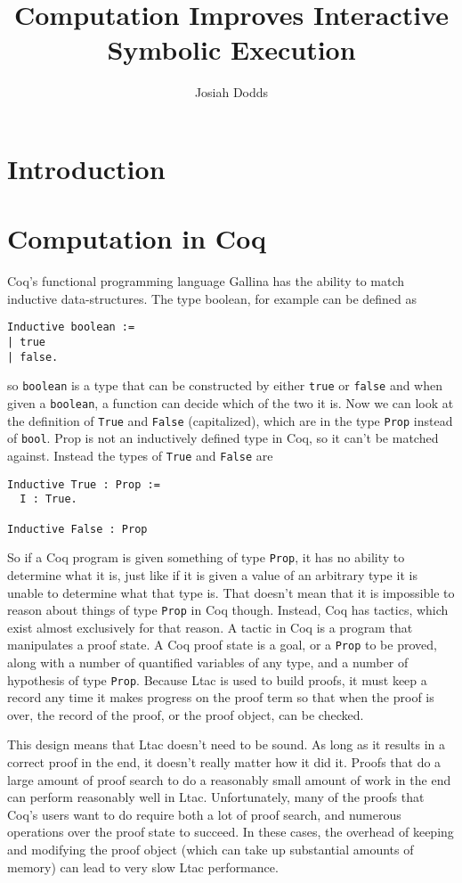 \documentclass{puthesis}
\author{Josiah Dodds}
\title{Computation Improves Interactive Symbolic Execution}
\begin{document}
\chapter{Introduction}

\chapter{Computation in Coq}

Coq's functional programming language Gallina has the ability to match inductive
data-structures. The type boolean, for example can be defined as

\begin{lstlisting}
Inductive boolean :=
| true
| false.
\end{lstlisting}

so \lstinline|boolean| is a type that can be constructed by either \lstinline|true| or \lstinline|false|
and when given a \lstinline|boolean|, a function can decide which of the two it is. Now we can look 
at the definition of \lstinline|True| and \lstinline|False| (capitalized), which are in the type 
\lstinline|Prop| instead of \lstinline|bool|. Prop is not an
inductively defined type in Coq, so it can't be matched
against. Instead the types of \lstinline|True| and \lstinline|False|
are

\begin{lstlisting}
Inductive True : Prop :=
  I : True.

Inductive False : Prop
\end{lstlisting}

So if a Coq program is given something of type \lstinline|Prop|, it
has no ability to determine what it is, just like if it is given a
value of an arbitrary type it is unable to determine what that type
is. That doesn't mean that it is impossible to reason about things of
type \lstinline|Prop| in Coq though. Instead, Coq has tactics, which
exist almost exclusively for that reason. A tactic in Coq is a program
that manipulates a proof state. A Coq proof state is a goal, or a
\lstinline|Prop| to be proved, along with a number of quantified
variables of any type, and a number of hypothesis of type
\lstinline|Prop|. Because Ltac is used to build proofs, it must keep a
record any time it makes progress on the proof term so that when the
proof is over, the record of the proof, or the proof object, can be
checked.

This design means that Ltac doesn't need to be sound. As long as it
results in a correct proof in the end, it doesn't really matter how it
did it. Proofs that do a large amount of proof search to do a
reasonably small amount of work in the end can perform reasonably well
in Ltac. Unfortunately, many of the proofs that Coq's users want to do
require both a lot of proof search, and numerous operations over the
proof state to succeed. In these cases, the overhead of keeping and
modifying the
proof object (which can take up substantial amounts of memory) can
lead to very slow Ltac performance. 
\end{document}
